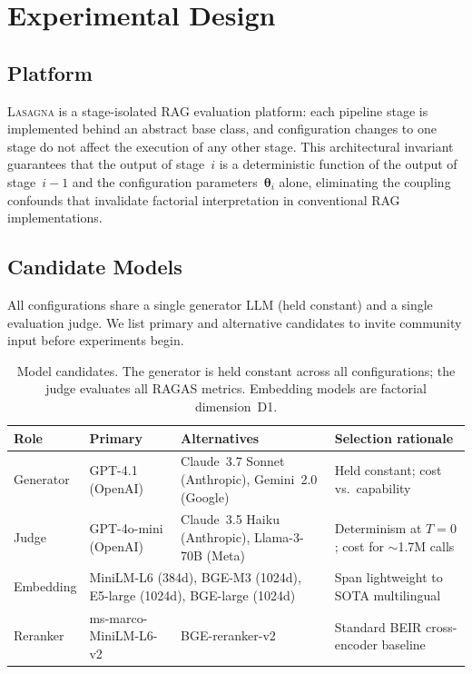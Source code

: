 \documentclass[11pt]{article}
\begin{document}
\section{Experimental Design}
\label{sec:design}

\subsection{Platform}

\textsc{Lasagna} is a stage-isolated RAG evaluation platform: each
pipeline stage is implemented behind an abstract base class, and
configuration changes to one stage do not affect the execution of any
other stage.  This architectural invariant guarantees that the output
of stage~$i$ is a deterministic function of the output of stage~$i{-}1$
and the configuration parameters~$\boldsymbol{\theta}_i$ alone,
eliminating the coupling confounds that invalidate factorial
interpretation in conventional RAG implementations.

\subsection{Candidate Models}
\label{sec:models}

All configurations share a single generator LLM (held constant) and a
single evaluation judge.  We list primary and alternative candidates
to invite community input before experiments begin.

\begin{table}[h]
\centering
\footnotesize
\caption{Model candidates.  The generator is held constant across all
  configurations; the judge evaluates all RAGAS metrics.  Embedding
  models are factorial dimension~D1.}
\label{tab:models}
\begin{tabular}{@{}p{2.0cm}p{3.4cm}p{3.8cm}p{4.0cm}@{}}
\toprule
\textbf{Role} & \textbf{Primary} & \textbf{Alternatives} & \textbf{Selection rationale} \\
\midrule
Generator    & GPT-4.1 (OpenAI)
             & Claude~3.7 Sonnet (Anthropic), Gemini~2.0 (Google)
             & Held constant; cost vs.\ capability \\
\addlinespace
Judge        & GPT-4o-mini (OpenAI)
             & Claude~3.5 Haiku (Anthropic), Llama-3-70B (Meta)
             & Determinism at $T{=}0$; cost for ${\sim}$1.7M calls \\
\addlinespace
Embedding    & \multicolumn{2}{l}{MiniLM-L6 (384d), BGE-M3 (1024d), E5-large (1024d), BGE-large (1024d)}
             & Span lightweight to SOTA multilingual \\
\addlinespace
Reranker     & ms-marco-MiniLM-L6-v2
             & BGE-reranker-v2
             & Standard BEIR cross-encoder baseline \\
\bottomrule
\end{tabular}
\end{table}
\end{document}
